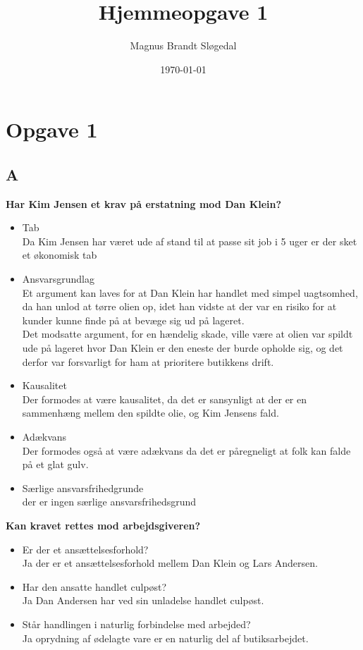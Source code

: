 \documentclass[11pt, a4paper]{article}
\title{Hjemmeopgave 1}
\author{Magnus Brandt Sløgedal}
\date{\today}
\begin{document}
\maketitle
\section{Opgave 1}
\subsection*{A}
\textbf{Har Kim Jensen et krav på erstatning mod Dan Klein?}
\begin{itemize}
  \item Tab\\
  Da Kim Jensen har været ude af stand til at passe sit job i 5 uger er der sket
  et økonomisk tab
  \item Ansvarsgrundlag\\
  Et argument kan laves for at Dan Klein har handlet med simpel uagtsomhed, da
  han unlod at tørre olien op, idet han vidste at der var en risiko for at
  kunder kunne finde på at bevæge sig ud på lageret.\\ Det modsatte argument,
  for en hændelig skade, ville være at olien var spildt ude på lageret hvor Dan
  Klein er den eneste der burde opholde sig, og det derfor var forsvarligt for
  ham at prioritere butikkens drift.
  \item Kausalitet\\
  Der formodes at være kausalitet, da det er sansynligt at der er en sammenhæng
  mellem den spildte olie, og Kim Jensens fald. 
  \item Adækvans\\
  Der formodes også at være adækvans da det er påregneligt at folk kan falde på
  et glat gulv.
  \item Særlige ansvarsfrihedgrunde\\
  der er ingen særlige ansvarsfrihedsgrund
\end{itemize}

\textbf{Kan kravet rettes mod arbejdsgiveren?}
\begin{itemize}
  \item Er der et ansættelsesforhold?\\
  Ja der er et ansættelsesforhold mellem Dan Klein og Lars Andersen.
  \item Har den ansatte handlet culpøst?\\
  Ja Dan Andersen har ved sin unladelse handlet culpøst.
  \item Står handlingen i naturlig forbindelse med arbejded?\\
  Ja oprydning af ødelagte vare er en naturlig del af butiksarbejdet.
\end{itemize}
\end{document}
